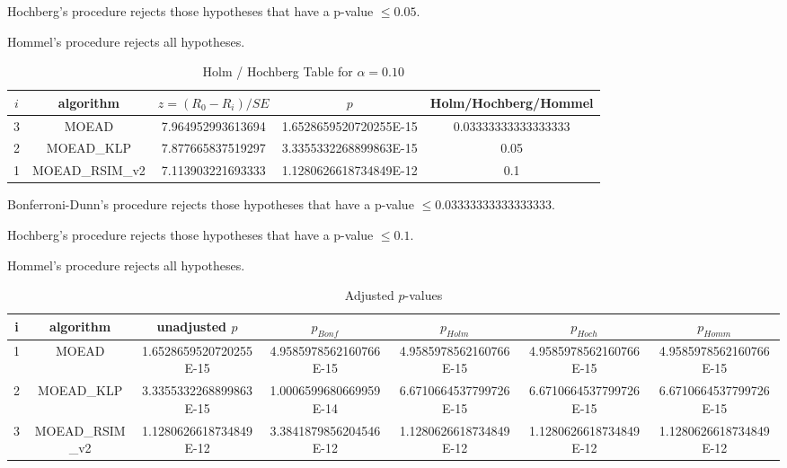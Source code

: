 \documentclass[a4paper,10pt]{article}
\begin{document}
\begin{landscape}
Hochberg's procedure rejects those hypotheses that have a p-value $\le0.05$.


Hommel's procedure rejects all hypotheses.


\begin{table}[!htp]
\centering\tiny
\caption{Holm / Hochberg Table for $\alpha=0.10$}
\begin{tabular}{ccccc}
$i$&algorithm&$z=(R_0 - R_i)/SE$&$p$&Holm/Hochberg/Hommel\\
\hline
3&MOEAD&7.964952993613694&1.6528659520720255E-15&0.03333333333333333\\
2&MOEAD_KLP&7.877665837519297&3.3355332268899863E-15&0.05\\
1&MOEAD_RSIM_v2&7.113903221693333&1.1280626618734849E-12&0.1\\
\hline
\end{tabular}
\end{table}
Bonferroni-Dunn's procedure rejects those hypotheses that have a p-value $\le0.03333333333333333$.


Hochberg's procedure rejects those hypotheses that have a p-value $\le0.1$.


Hommel's procedure rejects all hypotheses.


\begin{table}[!htp]
\centering\tiny
\caption{Adjusted $p$-values}
\begin{tabular}{ccccccc}
i&algorithm&unadjusted $p$&$p_{Bonf}$&$p_{Holm}$&$p_{Hoch}$&$p_{Homm}$\\
\hline
1&MOEAD&1.6528659520720255E-15&4.9585978562160766E-15&4.9585978562160766E-15&4.9585978562160766E-15&4.9585978562160766E-15\\
2&MOEAD_KLP&3.3355332268899863E-15&1.0006599680669959E-14&6.6710664537799726E-15&6.6710664537799726E-15&6.6710664537799726E-15\\
3&MOEAD_RSIM_v2&1.1280626618734849E-12&3.3841879856204546E-12&1.1280626618734849E-12&1.1280626618734849E-12&1.1280626618734849E-12\\
\hline
\end{tabular}
\end{table}


\end{landscape}
\end{document}
